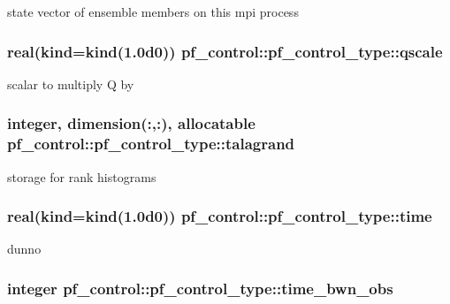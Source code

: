 state vector of ensemble members on this mpi process 

\hypertarget{structpf__control_1_1pf__control__type_a48fc82562f2982c72312a1bba7d03d0d}{
\subsubsection[{qscale}]{\setlength{\rightskip}{0pt plus 5cm}real(kind=kind(1.\-0d0)) pf\-\_\-control\-::pf\-\_\-control\-\_\-type\-::qscale}}\label{structpf__control_1_1pf__control__type_a48fc82562f2982c72312a1bba7d03d0d}


scalar to multiply Q by 

\hypertarget{structpf__control_1_1pf__control__type_aa35adefc9a96845c065fd01ecf99b37d}{
\subsubsection[{talagrand}]{\setlength{\rightskip}{0pt plus 5cm}integer, dimension(\-:,\-:), allocatable pf\-\_\-control\-::pf\-\_\-control\-\_\-type\-::talagrand}}\label{structpf__control_1_1pf__control__type_aa35adefc9a96845c065fd01ecf99b37d}


storage for rank histograms 

\hypertarget{structpf__control_1_1pf__control__type_a4240d041987192d6b192b6910efeb29a}{
\subsubsection[{time}]{\setlength{\rightskip}{0pt plus 5cm}real(kind=kind(1.\-0d0)) pf\-\_\-control\-::pf\-\_\-control\-\_\-type\-::time}}\label{structpf__control_1_1pf__control__type_a4240d041987192d6b192b6910efeb29a}


dunno 

\hypertarget{structpf__control_1_1pf__control__type_a13e65bce20eb3de30403efca169f9635}{
\subsubsection[{time\-\_\-bwn\-\_\-obs}]{\setlength{\rightskip}{0pt plus 5cm}integer pf\-\_\-control\-::pf\-\_\-control\-\_\-type\-::time\-\_\-bwn\-\_\-obs}}\label{structpf__control_1_1pf__control__type_a13e65bce20eb3de30403efca169f9635}


